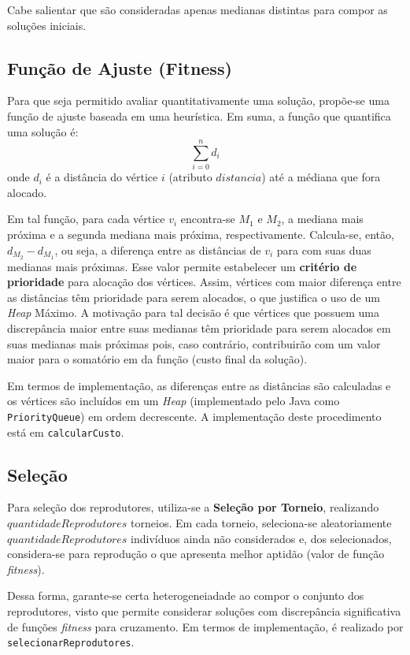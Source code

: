 	Cabe salientar que são consideradas apenas medianas distintas para compor as soluções iniciais.

	\subsection{Função de Ajuste (Fitness)}
	Para que seja permitido avaliar quantitativamente uma solução, propõe-se uma função de ajuste baseada em uma heurística. Em suma, a função que quantifica uma solução é:
	$$\sum_{i=0}^{n}d_i$$
	onde $d_i$ é a distância do vértice $i$ (atributo $distancia$) até a médiana que fora alocado.

	Em tal função, para cada vértice $v_i$ encontra-se $M_1$ e $M_2$, a mediana mais próxima e a segunda mediana mais próxima, respectivamente. Calcula-se, então, $d_{M_2} - d_{M_1}$, ou seja, a diferença entre as distâncias de $v_i$ para com suas duas medianas mais próximas. Esse valor permite estabelecer um \textbf{critério de prioridade} para alocação dos vértices. Assim, vértices com maior diferença entre as distâncias têm prioridade para serem alocados, o que justifica o uso de um \textit{Heap} Máximo. A motivação para tal decisão é que vértices que possuem uma discrepância maior entre suas medianas têm prioridade para serem alocados em suas medianas mais próximas pois, caso contrário, contribuirão com um valor maior para o somatório em da função (custo final da solução).

	Em termos de implementação, as diferenças entre as distâncias são calculadas e os vértices são incluídos em um \textit{Heap} (implementado pelo Java como \verb|PriorityQueue|) em ordem decrescente. A implementação deste procedimento está em \verb|calcularCusto|.

	\subsection{Seleção}
	Para seleção dos reprodutores, utiliza-se a \textbf{Seleção por Torneio}, realizando $quantidadeReprodutores$ torneios. Em cada torneio, seleciona-se aleatoriamente $quantidadeReprodutores$ indivíduos ainda não considerados e, dos selecionados, considera-se para reprodução o que apresenta melhor aptidão (valor de função \textit{fitness}).

	Dessa forma, garante-se certa heterogeneiadade ao compor o conjunto dos reprodutores, visto que permite considerar soluções com discrepância significativa de funções \textit{fitness} para cruzamento. Em termos de implementação, é realizado por \verb|selecionarReprodutores|.

